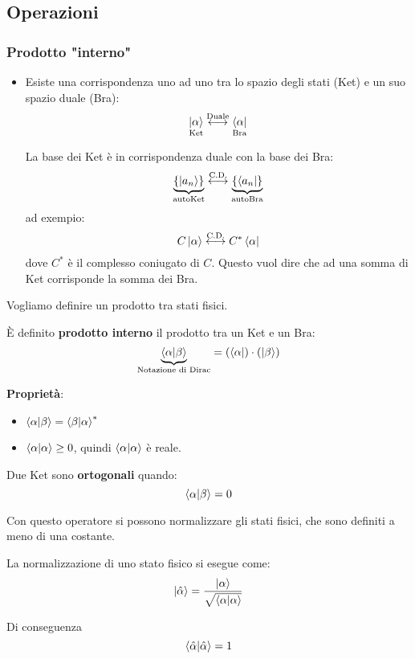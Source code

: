 \documentclass[a4paper]{article}
\begin{document}
\subsection{Operazioni}
\subsubsection{Prodotto "interno"}
\begin{itemize}
  \item Esiste una corrispondenza uno ad uno tra lo spazio degli stati (Ket) e un suo
    spazio duale (Bra):
    \[
      \underset{\text{Ket}}{\ket{\alpha}} \stackrel{\text{Duale}}{\longleftrightarrow} 
      \underset{\text{Bra}}{\bra{\alpha}}
    \] 

    La base dei Ket è in corrispondenza duale con la base dei Bra:
    \[
      \underbrace{\{\ket{a_n}\}}_{\text{autoKet}} \stackrel{\text{C.D.}}{\longleftrightarrow}
      \underbrace{\{\bra{a_n}\}}_{\text{autoBra}}
    \]
    ad exempio:
    \[
      C \ket{\alpha} \stackrel{\text{C.D.}}{\longleftrightarrow} C^* \bra{\alpha}
    \] 
    dove \( C^* \) è il complesso coniugato di \( C \). Questo vuol dire che ad una
    somma di Ket corrisponde la somma dei Bra.
\end{itemize}
Vogliamo definire un prodotto tra stati fisici.
\begin{definition}
  È definito \textbf{prodotto interno} il prodotto tra un Ket e un Bra:
  \[
    \underbrace{\braket{\alpha}{\beta}}_{\text{Notazione di Dirac}} = \left(\bra{\alpha}\right) \cdot \left(\ket{\beta}\right)
  \] 
\end{definition}

\vspace{1em}
\noindent
\textbf{Proprietà}:

\begin{itemize}
  \item \( \braket{\alpha}{\beta} = \braket{\beta}{\alpha}^* \) 
  \item \( \braket{\alpha}{\alpha} \geq 0 \), quindi \( \braket{\alpha}{\alpha} \) è reale.
\end{itemize}

\begin{definition}
  Due Ket sono \textbf{ortogonali} quando:
  \[
    \braket{\alpha}{\beta} = 0
  \] 
\end{definition}

\vspace{3em}
\noindent
Con questo operatore si possono normalizzare gli stati fisici, che sono definiti a meno di
una costante.
\begin{definition}[Normalizzazione]
  La normalizzazione di uno stato fisico si esegue come:
  \[
    \ket{\hat{\alpha}} = \frac{\ket{\alpha}}{\sqrt{\braket{\alpha}{\alpha}}}
  \] 

  \vspace{1em}
  \noindent
  Di conseguenza
  \[
    \braket{\hat{\alpha}}{\hat{\alpha}} = 1
  \] 
\end{definition}
\end{document}
